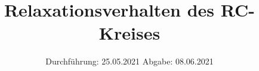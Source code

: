 

\subject{702}
\title{Relaxationsverhalten des RC-Kreises}
\date{%
  Durchführung: 25.05.2021
  \hspace{3em}
  Abgabe: 08.06.2021
}



\maketitle
\thispagestyle{empty}
\tableofcontents
\newpage



%
%



\printbibliography{}


